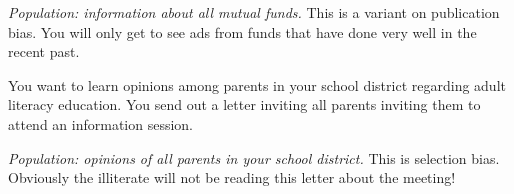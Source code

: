\documentclass[11pt]{exam}
\begin{document}
\begin{questions}
 \begin{solution}
 \textit{Population: information about all mutual funds.}
 This is a variant on publication bias. You will only get to see ads from
 funds that have done very well in the recent past.
 \end{solution}
 
 
 
 \question You want to learn opinions among parents in your school district regarding
 adult literacy education.  You send out a letter inviting all parents inviting
 them to attend an information session.
 
 \begin{solution}
 \textit{Population: opinions of all parents in your school district.}
 This is selection bias. Obviously the illiterate will not be reading this
 letter about the meeting!
 \end{solution}
 







\end{questions}
\end{document}
